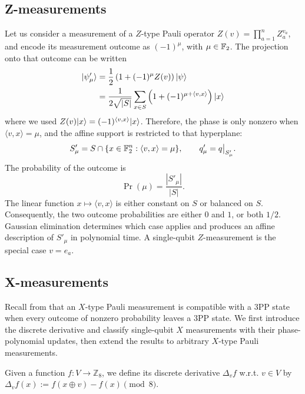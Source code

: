 \subsection{Z-measurements}
\label{sec:z-measurements-3pp}

Let us consider a measurement of a $Z$-type Pauli operator $Z(v)=\prod_{a=1}^n Z_a^{v_a}$, and encode its measurement outcome
as $(-1)^\mu$, with $\mu\in\F_2$.
The projection onto that outcome can be written
\begin{align}
    \ket{\psi'_\mu} &= \frac{1}{2}\left( 1 + (-1)^\mu Z(v) \right)\ket{\psi} \\
    &= \frac{1}{2\sqrt{|S|}} \sum_{x\in S}
    \left( 1 + (-1)^{\mu+\langle v,x\rangle} \right)\ket{x} \\
\end{align}
where we used $Z(v)\ket{x}=(-1)^{\langle v,x\rangle}\ket{x}$.
Therefore, the phase is only nonzero when $\langle v,x\rangle=\mu$, and the affine support is restricted to that hyperplane:
\begin{equation} \label{eq:phase-polynomial-z-measurement-update}
    S'_\mu
    =S\cap\{x\in\F_2^n:\langle v,x\rangle=\mu\},
    \qquad
    q'_\mu=q\big|_{S'_\mu}.
\end{equation}
The probability of the outcome is
\begin{equation}
    \Pr(\mu)=\frac{|S'_\mu|}{|S|}.
\end{equation}
The linear function $x\mapsto\langle v,x\rangle$ is either constant on
$S$ or balanced on $S$.  Consequently, the two outcome probabilities are
either $0$ and $1$, or both $1/2$.  Gaussian elimination determines which
case applies and produces an affine description of $S'_\mu$ in polynomial
time.  A single-qubit $Z$-measurement is the special case $v=e_a$.

\subsection{X-measurements}

Recall from  that an $X$-type Pauli measurement is compatible with a 3PP state when every outcome of nonzero probability leaves a 3PP state. We first introduce the discrete derivative and classify single-qubit $X$ measurements with their phase-polynomial updates, then extend the results to arbitrary $X$-type Pauli measurements.

\begin{definition}\label{def:discrete-derivative}
    Given a function $f: V \to \mathbb Z_8$, we define its discrete derivative $\Delta_v f$ w.r.t. $v \in V$ by $\Delta_v f(x) := f(x \oplus v) - f(x) \pmod 8.$
\end{definition}


